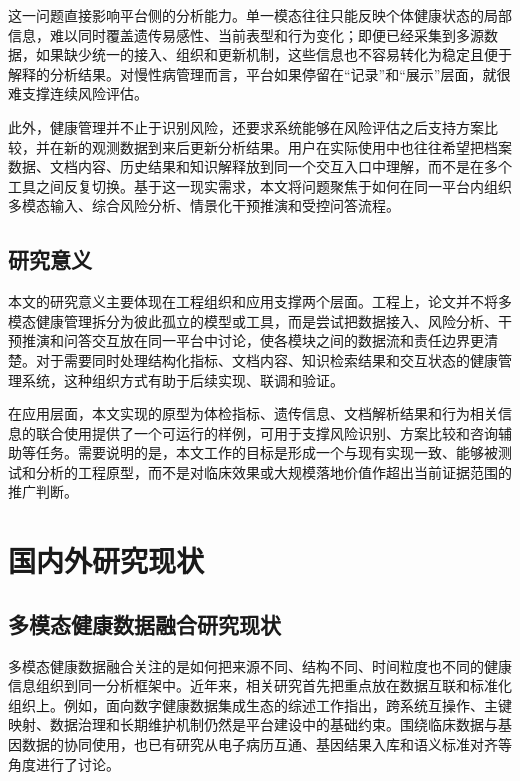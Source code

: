 这一问题直接影响平台侧的分析能力。单一模态往往只能反映个体健康状态的局部信息，难以同时覆盖遗传易感性、当前表型和行为变化；即便已经采集到多源数据，如果缺少统一的接入、组织和更新机制，这些信息也不容易转化为稳定且便于解释的分析结果。对慢性病管理而言，平台如果停留在“记录”和“展示”层面，就很难支撑连续风险评估。

此外，健康管理并不止于识别风险，还要求系统能够在风险评估之后支持方案比较，并在新的观测数据到来后更新分析结果。用户在实际使用中也往往希望把档案数据、文档内容、历史结果和知识解释放到同一个交互入口中理解，而不是在多个工具之间反复切换。基于这一现实需求，本文将问题聚焦于如何在同一平台内组织多模态输入、综合风险分析、情景化干预推演和受控问答流程。

\subsection{研究意义}

本文的研究意义主要体现在工程组织和应用支撑两个层面。工程上，论文并不将多模态健康管理拆分为彼此孤立的模型或工具，而是尝试把数据接入、风险分析、干预推演和问答交互放在同一平台中讨论，使各模块之间的数据流和责任边界更清楚。对于需要同时处理结构化指标、文档内容、知识检索结果和交互状态的健康管理系统，这种组织方式有助于后续实现、联调和验证。

在应用层面，本文实现的原型为体检指标、遗传信息、文档解析结果和行为相关信息的联合使用提供了一个可运行的样例，可用于支撑风险识别、方案比较和咨询辅助等任务。需要说明的是，本文工作的目标是形成一个与现有实现一致、能够被测试和分析的工程原型，而不是对临床效果或大规模落地价值作超出当前证据范围的推广判断。

\section{国内外研究现状}

\subsection{多模态健康数据融合研究现状}

多模态健康数据融合关注的是如何把来源不同、结构不同、时间粒度也不同的健康信息组织到同一分析框架中。近年来，相关研究首先把重点放在数据互联和标准化组织上。例如，面向数字健康数据集成生态的综述工作指出，跨系统互操作、主键映射、数据治理和长期维护机制仍然是平台建设中的基础约束\cite{ambalavanan2025ecosystem}。围绕临床数据与基因数据的协同使用，也已有研究从电子病历互通、基因结果入库和语义标准对齐等角度进行了讨论\cite{carter2022ehrgenomics}。

